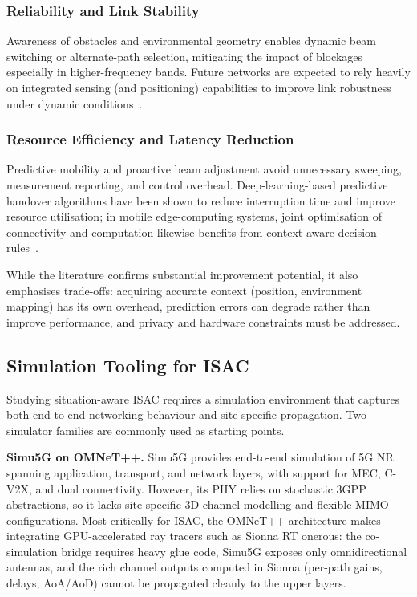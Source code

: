 \subsubsection{Reliability and Link Stability}
Awareness of obstacles and environmental geometry enables dynamic beam
switching or alternate-path selection, mitigating the impact of blockages
especially in higher-frequency bands. Future networks are expected to rely
heavily on integrated sensing (and positioning) capabilities to improve link
robustness under dynamic conditions~\cite{ref:positioning_6g}.

\subsubsection{Resource Efficiency and Latency Reduction}
Predictive mobility and proactive beam adjustment avoid unnecessary sweeping,
measurement reporting, and control overhead. Deep-learning-based predictive
handover algorithms have been shown to reduce interruption time and improve
resource utilisation; in mobile edge-computing systems, joint optimisation of
connectivity and computation likewise benefits from context-aware decision
rules~\cite{ref:predictive_handover}.

While the literature confirms substantial improvement potential, it also
emphasises trade-offs: acquiring accurate context (position, environment
mapping) has its own overhead, prediction errors can degrade rather than
improve performance, and privacy and hardware constraints must be addressed.

\subsection{Simulation Tooling for ISAC}

Studying situation-aware ISAC requires a simulation environment that captures
both end-to-end networking behaviour and site-specific propagation. Two
simulator families are commonly used as starting points.

\textbf{Simu5G on OMNeT++.} Simu5G provides end-to-end simulation of 5G NR
spanning application, transport, and network layers, with support for MEC,
C-V2X, and dual connectivity. However, its PHY relies on stochastic 3GPP
abstractions, so it lacks site-specific 3D channel modelling and flexible
MIMO configurations. Most critically for ISAC, the OMNeT++ architecture makes
integrating GPU-accelerated ray tracers such as Sionna RT onerous: the
co-simulation bridge requires heavy glue code, Simu5G exposes only
omnidirectional antennas, and the rich channel outputs computed in Sionna
(per-path gains, delays, AoA/AoD) cannot be propagated cleanly to the upper
layers.

